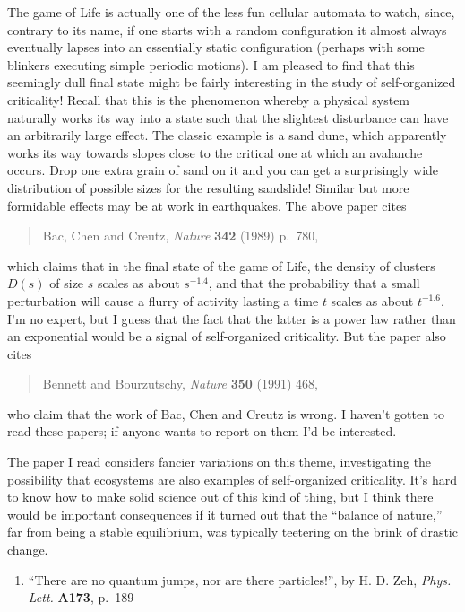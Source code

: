 \documentclass{article}
\def\tightlist{}
\begin{document}
The game of Life is actually one of the less fun cellular automata to
watch, since, contrary to its name, if one starts with a random
configuration it almost always eventually lapses into an essentially
static configuration (perhaps with some blinkers executing simple
periodic motions). I am pleased to find that this seemingly dull final
state might be fairly interesting in the study of self-organized
criticality! Recall that this is the phenomenon whereby a physical
system naturally works its way into a state such that the slightest
disturbance can have an arbitrarily large effect. The classic example is
a sand dune, which apparently works its way towards slopes close to the
critical one at which an avalanche occurs. Drop one extra grain of sand
on it and you can get a surprisingly wide distribution of possible sizes
for the resulting sandslide! Similar but more formidable effects may be
at work in earthquakes. The above paper cites

\begin{quote}
Bac, Chen and Creutz, \emph{Nature} \textbf{342} (1989) p.~780,
\end{quote}

which claims that in the final state of the game of Life, the density of
clusters \(D(s)\) of size \(s\) scales as about \(s^{-1.4}\), and that
the probability that a small perturbation will cause a flurry of
activity lasting a time \(t\) scales as about \(t^{-1.6}\). I'm no
expert, but I guess that the fact that the latter is a power law rather
than an exponential would be a signal of self-organized criticality. But
the paper also cites

\begin{quote}
Bennett and Bourzutschy, \emph{Nature} \textbf{350} (1991) 468,
\end{quote}

who claim that the work of Bac, Chen and Creutz is wrong. I haven't
gotten to read these papers; if anyone wants to report on them I'd be
interested.

The paper I read considers fancier variations on this theme,
investigating the possibility that ecosystems are also examples of
self-organized criticality. It's hard to know how to make solid science
out of this kind of thing, but I think there would be important
consequences if it turned out that the ``balance of nature,'' far from
being a stable equilibrium, was typically teetering on the brink of
drastic change.

\begin{enumerate}
\def\labelenumi{\arabic{enumi})}
\setcounter{enumi}{1}
\tightlist
\item
  ``There are no quantum jumps, nor are there particles!'', by H. D.
  Zeh, \emph{Phys. Lett.} \textbf{A173}, p.~189
\end{enumerate}
\end{document}
